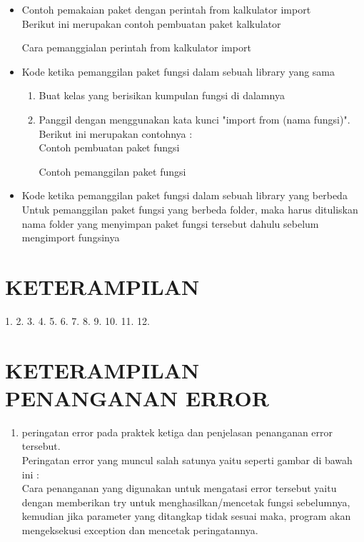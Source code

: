 \begin{itemize}
	\item Contoh pemakaian paket dengan perintah from kalkulator import\\
	Berikut ini merupakan contoh pembuatan paket kalkulator
	
	Cara pemanggialan perintah from kalkulator import
	
	\item Kode ketika pemanggilan paket fungsi dalam sebuah library yang sama\\
        \begin{enumerate}
	    \item Buat kelas yang berisikan kumpulan fungsi di dalamnya
	    \item Panggil dengan menggunakan kata kunci "import from (nama fungsi)". Berikut ini merupakan contohnya :\\ Contoh pembuatan paket fungsi
	    
	    Contoh pemanggilan paket fungsi
	    
	\end{enumerate}
	\item Kode ketika pemanggilan paket fungsi dalam sebuah library yang berbeda
		Untuk pemanggilan paket fungsi yang berbeda folder, maka harus dituliskan nama folder yang menyimpan paket fungsi tersebut dahulu sebelum mengimport fungsinya
\end{itemize}
\section{KETERAMPILAN}
1. 
2. 
3. 
4. 
5. 
6. 
7. 
8. 
9. 
10. 
11. 
12. 
    
\section{KETERAMPILAN PENANGANAN ERROR}
\begin{enumerate}
\item peringatan error pada praktek ketiga dan penjelasan penanganan error tersebut.\\
Peringatan error yang muncul salah satunya yaitu seperti gambar di bawah ini :\\

		Cara penanganan yang digunakan untuk mengatasi error tersebut yaitu dengan memberikan try untuk menghasilkan/mencetak fungsi sebelumnya, kemudian jika parameter yang ditangkap tidak sesuai maka, program akan mengeksekusi exception dan mencetak peringatannya.
\end{enumerate}
